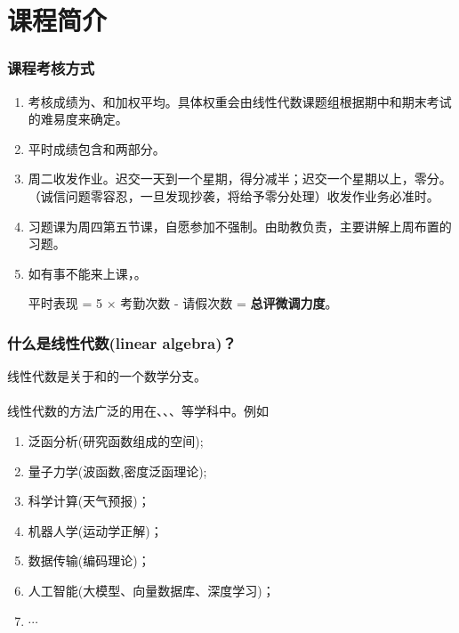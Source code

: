 



\section*{课程简介}


\begin{frame}[plain]\frametitle{课程考核方式}
\begin{enumerate}
\item 考核成绩为、和加权平均。具体权重会由线性代数课题组根据期中和期末考试的难易度来确定。
\bigskip

\item 平时成绩包含和两部分。
\bigskip

\item 周二收发作业。迟交一天到一个星期，得分减半；迟交一个星期以上，零分。（诚信问题零容忍，一旦发现抄袭，将给予零分处理）收发作业务必准时。
\bigskip


\item 习题课为周四第五节课，自愿参加不强制。由助教负责，主要讲解上周布置的习题。
\bigskip

\item 如有事不能来上课，。
\bigskip

\begin{center}
平时表现 = 5 × 考勤次数 - 请假次数 = \textbf{总评微调力度}。
\end{center}

\end{enumerate}
\end{frame}




\begin{frame}[plain]\frametitle{什么是线性代数(linear algebra)？}
\pp
线性代数是关于和的一个数学分支。
\ \\ \ \\
\pp
线性代数的方法广泛的用在、、、等学科中。例如
\begin{enumerate}
\item 泛函分析(研究函数组成的空间);
\item 量子力学(波函数,密度泛函理论);
\item 科学计算(天气预报)；
\item 机器人学(运动学正解)；
\item 数据传输(编码理论)；
\item 人工智能(大模型、向量数据库、深度学习)；
\item $\cdots$
\end{enumerate}\end{frame}




\begin{frame}[plain]
\end{frame}


